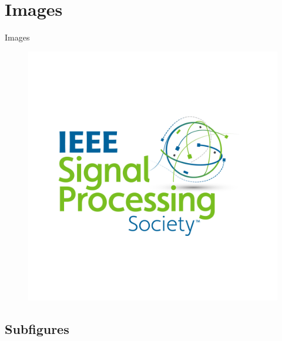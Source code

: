 \documentclass[aspectratio=169]{beamer}
\begin{document}
\section{Images}

\begin{frame}{Images}

\begin{figure}
    \centering
    \includegraphics[width=0.5\linewidth]{template/sps_logo.png}
\end{figure}

\end{frame}

\subsection{Subfigures}
\end{document}
